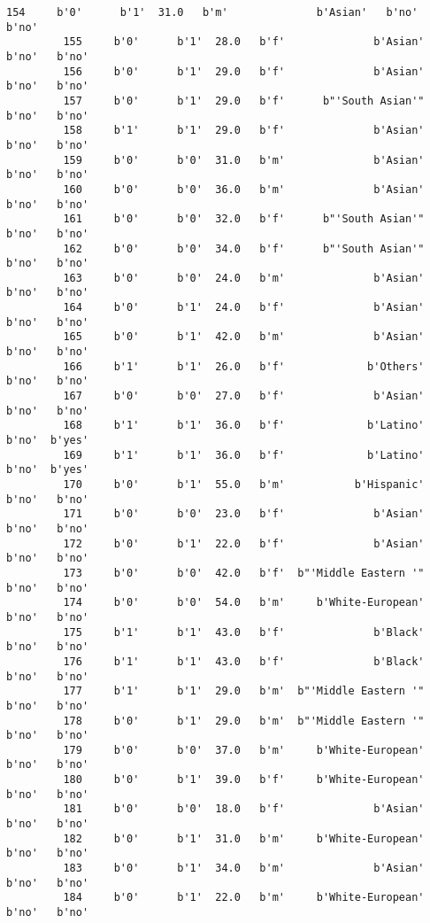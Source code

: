 \documentclass[11pt]{article}
\begin{document}
\begin{Verbatim}[commandchars=\\\{\}]
         154     b'0'      b'1'  31.0   b'm'              b'Asian'   b'no'   b'no'   
         155     b'0'      b'1'  28.0   b'f'              b'Asian'   b'no'   b'no'   
         156     b'0'      b'1'  29.0   b'f'              b'Asian'   b'no'   b'no'   
         157     b'0'      b'1'  29.0   b'f'      b"'South Asian'"   b'no'   b'no'   
         158     b'1'      b'1'  29.0   b'f'              b'Asian'   b'no'   b'no'   
         159     b'0'      b'0'  31.0   b'm'              b'Asian'   b'no'   b'no'   
         160     b'0'      b'0'  36.0   b'm'              b'Asian'   b'no'   b'no'   
         161     b'0'      b'0'  32.0   b'f'      b"'South Asian'"   b'no'   b'no'   
         162     b'0'      b'0'  34.0   b'f'      b"'South Asian'"   b'no'   b'no'   
         163     b'0'      b'0'  24.0   b'm'              b'Asian'   b'no'   b'no'   
         164     b'0'      b'1'  24.0   b'f'              b'Asian'   b'no'   b'no'   
         165     b'0'      b'1'  42.0   b'm'              b'Asian'   b'no'   b'no'   
         166     b'1'      b'1'  26.0   b'f'             b'Others'   b'no'   b'no'   
         167     b'0'      b'0'  27.0   b'f'              b'Asian'   b'no'   b'no'   
         168     b'1'      b'1'  36.0   b'f'             b'Latino'   b'no'  b'yes'   
         169     b'1'      b'1'  36.0   b'f'             b'Latino'   b'no'  b'yes'   
         170     b'0'      b'1'  55.0   b'm'           b'Hispanic'   b'no'   b'no'   
         171     b'0'      b'0'  23.0   b'f'              b'Asian'   b'no'   b'no'   
         172     b'0'      b'1'  22.0   b'f'              b'Asian'   b'no'   b'no'   
         173     b'0'      b'0'  42.0   b'f'  b"'Middle Eastern '"   b'no'   b'no'   
         174     b'0'      b'0'  54.0   b'm'     b'White-European'   b'no'   b'no'   
         175     b'1'      b'1'  43.0   b'f'              b'Black'   b'no'   b'no'   
         176     b'1'      b'1'  43.0   b'f'              b'Black'   b'no'   b'no'   
         177     b'1'      b'1'  29.0   b'm'  b"'Middle Eastern '"   b'no'   b'no'   
         178     b'0'      b'1'  29.0   b'm'  b"'Middle Eastern '"   b'no'   b'no'   
         179     b'0'      b'0'  37.0   b'm'     b'White-European'   b'no'   b'no'   
         180     b'0'      b'1'  39.0   b'f'     b'White-European'   b'no'   b'no'   
         181     b'0'      b'0'  18.0   b'f'              b'Asian'   b'no'   b'no'   
         182     b'0'      b'1'  31.0   b'm'     b'White-European'   b'no'   b'no'   
         183     b'0'      b'1'  34.0   b'm'              b'Asian'   b'no'   b'no'   
         184     b'0'      b'1'  22.0   b'm'     b'White-European'   b'no'   b'no'   

\end{Verbatim}
\end{document}
